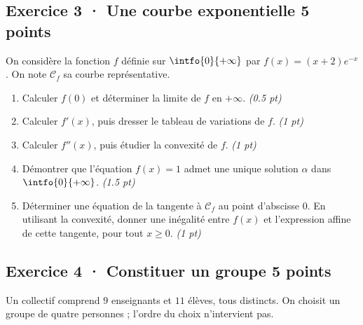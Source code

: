 \mxnewpage{}

\subsection*{Exercice 3 · Une courbe exponentielle \hfill 5 points}On considère la fonction $f$ définie sur $\intfo{0}{+\infty}$ par $f(x)=(x+2)e^{-x}$. On note $\mathcal C_f$ sa courbe représentative.

\begin{enumerate}

\item Calculer $f(0)$ et déterminer la limite de $f$ en $+\infty$. \hfill\textit{(\num{0,5} pt)}

\item Calculer $f' (x)$, puis dresser le tableau de variations de $f$. \hfill\textit{(1 pt)}

\item Calculer $f'' (x)$, puis étudier la convexité de $f$. \hfill\textit{(1 pt)}

\item Démontrer que l'équation $f(x)=1$ admet une unique solution $\alpha$ dans $\intfo{0}{+\infty}$. \hfill\textit{(\num{1,5} pt)}

\item Déterminer une équation de la tangente à $\mathcal C_f$ au point d'abscisse $0$. En utilisant la convexité, donner une inégalité entre $f(x)$ et l'expression affine de cette tangente, pour tout $x\ge0$. \hfill\textit{(1 pt)}

\end{enumerate}

\subsection*{Exercice 4 · Constituer un groupe \hfill 5 points}Un collectif comprend $9$ enseignants et $11$ élèves, tous distincts. On choisit un groupe de quatre personnes ; l'ordre du choix n'intervient pas.

